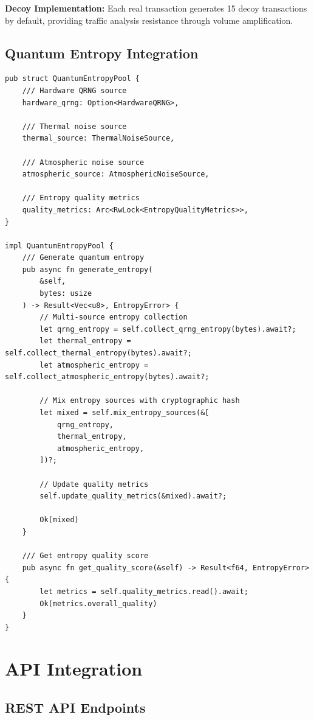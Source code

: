 \documentclass[12pt,a4paper]{article}
\begin{document}
\textbf{Decoy Implementation:} Each real transaction generates 15 decoy transactions by default, providing traffic analysis resistance through volume amplification.

\subsection{Quantum Entropy Integration}

\begin{lstlisting}[style=rustcode, caption=Quantum Entropy Pool]
pub struct QuantumEntropyPool {
    /// Hardware QRNG source
    hardware_qrng: Option<HardwareQRNG>,

    /// Thermal noise source
    thermal_source: ThermalNoiseSource,

    /// Atmospheric noise source
    atmospheric_source: AtmosphericNoiseSource,

    /// Entropy quality metrics
    quality_metrics: Arc<RwLock<EntropyQualityMetrics>>,
}

impl QuantumEntropyPool {
    /// Generate quantum entropy
    pub async fn generate_entropy(
        &self,
        bytes: usize
    ) -> Result<Vec<u8>, EntropyError> {
        // Multi-source entropy collection
        let qrng_entropy = self.collect_qrng_entropy(bytes).await?;
        let thermal_entropy = self.collect_thermal_entropy(bytes).await?;
        let atmospheric_entropy = self.collect_atmospheric_entropy(bytes).await?;

        // Mix entropy sources with cryptographic hash
        let mixed = self.mix_entropy_sources(&[
            qrng_entropy,
            thermal_entropy,
            atmospheric_entropy,
        ])?;

        // Update quality metrics
        self.update_quality_metrics(&mixed).await?;

        Ok(mixed)
    }

    /// Get entropy quality score
    pub async fn get_quality_score(&self) -> Result<f64, EntropyError> {
        let metrics = self.quality_metrics.read().await;
        Ok(metrics.overall_quality)
    }
}
\end{lstlisting}

\section{API Integration}

\subsection{REST API Endpoints}
\end{document}
